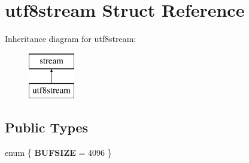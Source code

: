 \hypertarget{structutf8stream}{}\section{utf8stream Struct Reference}
\label{structutf8stream}
Inheritance diagram for utf8stream\+:\begin{figure}[H]
\begin{center}
\leavevmode
\includegraphics[height=2.000000cm]{structutf8stream}
\end{center}
\end{figure}
\subsection*{Public Types}
\begin{DoxyCompactItemize}
\item 
\mbox{\label{structutf8stream_a13619b369b728ffdb61d865801c1a8a5}} 
enum \{ {\bfseries B\+U\+F\+S\+I\+ZE} = 4096
 \}
\end{DoxyCompactItemize}
